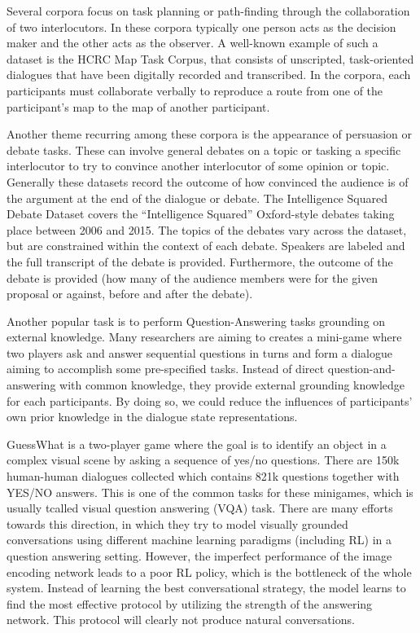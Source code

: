 \documentclass[bsc,frontabs,twoside,singlespacing,parskip,deptreport]{infthesis}     %
\begin{document}
Several corpora focus on task planning or path-finding through the collaboration of two interlocutors. In these corpora typically one person acts as the decision maker and the other acts as the observer. A well-known example of such a dataset is the HCRC Map Task Corpus\cite{anderson1991hcrc}, that consists of unscripted, task-oriented dialogues that have been digitally recorded and transcribed. In the corpora, each participants must collaborate verbally to reproduce a route from one of the participant’s map to the map of another participant. 

Another theme recurring among these corpora is the appearance of persuasion or debate tasks. These can involve general debates on a topic or tasking a specific interlocutor to try to convince another interlocutor of some opinion or topic. Generally these datasets record the outcome of how convinced the audience is of the argument at the end of the dialogue or debate. The Intelligence Squared Debate Dataset\cite{zhang2016conversational} covers the “Intelligence Squared” Oxford-style debates taking place between 2006 and 2015. The topics of the debates vary across the dataset, but are constrained within the context of each debate. Speakers are labeled and the full transcript of the debate is provided. Furthermore, the outcome of the debate is provided (how many of the audience members were for the given proposal or against, before and after the debate).

Another popular task is to perform  Question-Answering tasks grounding on external knowledge. Many researchers are aiming to creates a mini-game where two players ask and answer sequential questions in turns and form a dialogue aiming to accomplish some pre-specified tasks. Instead of direct question-and-answering with common knowledge, they provide external grounding knowledge for each participants. By doing so, we could reduce the influences of participants' own prior knowledge in the dialogue state representations.

GuessWhat\cite{de2017guesswhat} is a two-player game where the goal is to identify an object in a complex visual scene by asking a sequence of yes/no questions. There are 150k human-human dialogues collected which contains 821k questions together with YES/NO answers. This is one of the common tasks for these minigames, which is usually tcalled visual question answering (VQA) task. There are many efforts towards this direction\cite{strub2017end,shekhar2017foil,reddy2019coqa,zhou2018dataset,de2017guesswhat,das2017visual,das2017learning}, in which they try to model visually grounded conversations using different machine learning paradigms (including RL) in a question answering setting. However, the imperfect performance of the image encoding network leads to a poor RL policy, which is the bottleneck of the whole system. Instead of learning the best conversational strategy, the model learns to find the most effective protocol by utilizing the strength of the answering network. This protocol will clearly not produce natural conversations.
\end{document}
